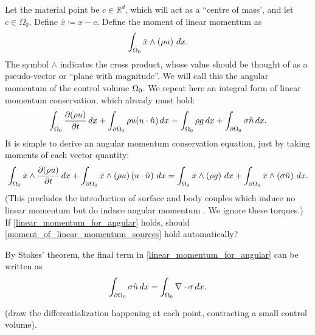Let the material point be $c \in \mathbb{R}^d$, which will act as a ``centre of mass', and let $c \in \Omega_0$.
Define $\bar{x} \coloneqq x - c$.
Define the moment of linear momentum as
\begin{equation}\label{moment_of_linear_momentum}
    \int_{{\Omega_0}} \bar{x} \wedge \left(\rho u\right)\,dx.
\end{equation}
The symbol $\wedge$ indicates the cross product, whose value should be thought of as a pseudo-vector or ``plane with magnitude''.
We will call this the angular momentum of the control volume ${\Omega_0}$.
We repeat here an integral form of linear momentum conservation, which already must hold:
\begin{equation}\label{linear_momentum_for_angular}
    \int_{{\Omega_0}} \frac{\partial (\rho u)}{\partial t}\,dx + \int_{{\partial\Omega_0}} \rho u (u\cdot \hat{n})\,dx
    = \int_{{\Omega_0}} \rho g\,dx + \int_{{\partial\Omega_0}} \sigma \hat{n}\,dx.
\end{equation}
It is simple to derive an angular momentum conservation equation, just by taking moments of each vector quantity:
\begin{equation}\label{moment_of_linear_momentum_sources}
    \int_{{\Omega_0}} \bar{x} \wedge \frac{\partial (\rho u)}{\partial t}\,dx + \int_{{\partial\Omega_0}} \bar{x} \wedge \left(\rho u\right)\left(u\cdot \hat{n}\right)\,dx
    = \int_{{\Omega_0}} \bar{x} \wedge \left(\rho g\right)\,dx + \int_{{\partial\Omega_0}} \bar{x} \wedge \left(\sigma \hat{n}\right)\,dx.
\end{equation}
(This precludes the introduction of surface and body couples which induce no linear momentum but do induce angular momentum
\cite{leal}. We ignore these torques.)
\\
If \eqref{linear_momentum_for_angular} holds, should \eqref{moment_of_linear_momentum_sources} hold automatically?
% 

By Stokes' theorem, the final term in \eqref{linear_momentum_for_angular} can be written as
\begin{align*}
    \int_{{\partial\Omega_0}} \sigma\hat{n}\,dx = \int_{\Omega_0}\nabla\cdot\sigma\,dx.
\end{align*}

\vskip 0.2in
(draw the differentialization happening at each point, contracting a small control volume).
\vskip 0.2in

